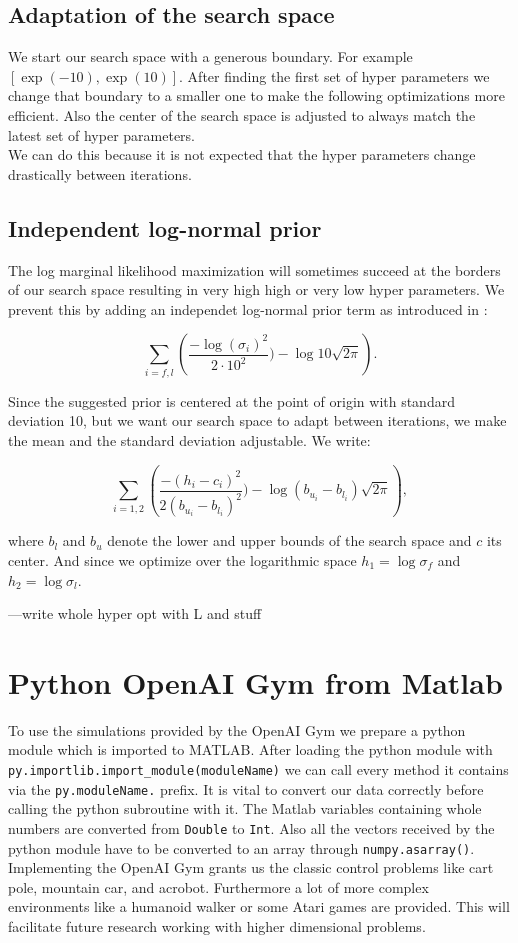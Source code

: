 \subsection{Adaptation of the search space}
We start our search space with a generous boundary. For example $[\exp(-10),\exp(10)]$. After finding the first set of hyper parameters we change that boundary to a smaller one to make the following optimizations more efficient. Also the center of the search space is adjusted to always match the latest set of hyper parameters.\\
We can do this because it is not expected that the hyper parameters change drastically between iterations.

\subsection{Independent log-normal prior}
The log marginal likelihood maximization will sometimes succeed at the borders of our search space resulting in very high high or very low hyper parameters. We prevent this by adding an independet log-normal prior term as introduced in \cite{lizotte2008practical}:

$$\sum_{i=f,l}\left(\frac{-\log(\sigma_i)^2}{2\cdot 10^2}) - \log 10\sqrt{2\pi} \right).$$

Since the suggested prior is centered at the point of origin with standard deviation 10, but we want our search space to adapt between iterations, we make the mean and the standard deviation adjustable. We write:

$$\sum_{i=1,2}\left(\frac{-(h_i-c_i)^2}{2(b_{u_i}-b_{l_i})^2}) - \log(b_{u_i}-b_{l_i})\sqrt{2\pi} \right),$$

where $b_l$ and $b_u$ denote the lower and upper bounds of the search space and $c$ its center. And since we optimize over the logarithmic space $h_1 = \log\sigma_f$ and $h_2 = \log\sigma_l$.


---write whole hyper opt with L and stuff

\section{Python OpenAI Gym from Matlab}
To use the simulations provided by the OpenAI Gym we prepare a python module which is imported to MATLAB. After loading the python module with \verb|py.importlib.import_module(moduleName)| we can call every method it contains via the \verb|py.moduleName.| prefix. It is vital to convert our data correctly before calling the python subroutine with it. The Matlab variables containing whole numbers are converted from \verb|Double| to \verb|Int|. Also all the vectors received by the python module have to be converted to an array through \verb|numpy.asarray()|.\\
Implementing the OpenAI Gym grants us the classic control problems like cart pole, mountain car, and acrobot. Furthermore a lot of more complex environments like a humanoid walker or some Atari games are provided\cite{DBLP:journals/corr/BrockmanCPSSTZ16}. This will facilitate future research working with higher dimensional problems.
